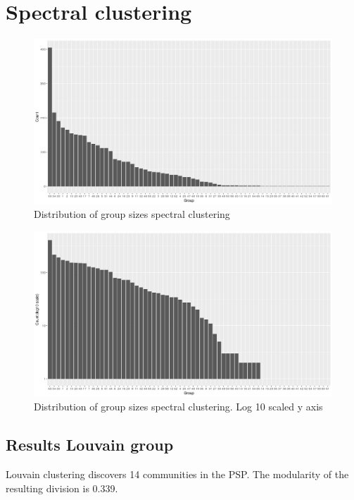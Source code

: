 \section{Spectral clustering}

\begin{figure}
    \centering
    \includegraphics[width=\textwidth]{images/Rplot_group_size_spectral.png}
    \caption{Distribution of group sizes spectral clustering}
    \label{fig:group sizes spectral clustering shows power law distribution}
\end{figure}

\begin{figure}
    \centering
    \includegraphics[width=\textwidth]{images/Rplot_spectral_groups_size_log10.png}
    \caption{Distribution of group sizes spectral clustering. Log 10 scaled y axis}
    \label{fig:group sizes spectral clustering log 10}
\end{figure}




\subsection{Results Louvain group}
Louvain clustering discovers 14 communities in the PSP. The modularity of the resulting division is 0.339. 


